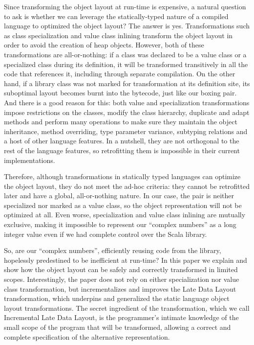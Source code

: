 Since transforming the object layout at run-time is expensive, a natural question to ask is whether we can leverage the statically-typed nature of a compiled language to optimized the object layout? The answer is yes. Transformations such as class specialization and value class inlining transform the object layout in order to avoid the creation of heap objects. However, both of these transformations are all-or-nothing: if a class was declared to be a value class or a specialized class during its definition, it will be transformed transitively in all the code that references it, including through separate compilation. On the other hand, if a library class was not marked for transformation at its definition site, its suboptimal layout becomes burnt into the bytecode, just like our boxing pair. And there is a good reason for this: both value and specialization transformations impose restrictions on the classes, modify the class hierarchy, duplicate and adapt methods and perform many operations to make sure they maintain the object inheritance, method overriding, type parameter variance, subtyping relations and a host of other language features. In a nutshell, they are not orthogonal to the rest of the language features, so retrofitting them is impossible in their current implementations.

Therefore, although transformations in statically typed languages can optimize the object layout, they do not meet the ad-hoc criteria: they cannot be retrofitted later and have a global, all-or-nothing nature. In our case, the pair is neither specialized nor marked as a value class, so the object representation will not be optimized at all. Even worse, specialization and value class inlining are mutually exclusive, making it impossible to represent our ``complex numbers'' as a long integer value even if we had complete control over the Scala library.

So, are our ``complex numbers'', efficiently reusing code from the library, hopelessly predestined to be inefficient at run-time? In this paper we explain and show how the object layout can be safely and correctly transformed in limited scopes. Interestingly, the paper does not rely on either specialization nor value class transformation, but incrementalizes and improves the Late Data Layout transformation, which underpins and generalized the static language object layout transformations. The secret ingredient of the transformation, which we call Incremental Late Data Layout, is the programmer's intimate knowledge of the small scope of the program that will be transformed, allowing a correct and complete specification of the alternative representation.

